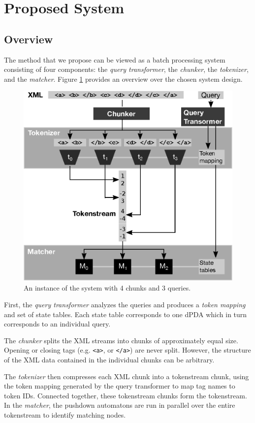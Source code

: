 \section{Proposed System}\label{sec:yourmethod}

\subsection{Overview}
The method that we propose can be viewed as a batch processing system consisting
of four components: the \emph{query
transformer}, the \emph{chunker}, the \emph{tokenizer}, and the \emph{matcher}.
Figure \ref{fig:methodoverview} provides an overview over the chosen system design.

\begin{figure}[tb]\centering
	\includegraphics[width=.5\textwidth]{img/methodoverview.eps}
  \caption{An instance of the system with 4 chunks and 3 queries.}
  \label{fig:methodoverview}
\end{figure}

First, the \emph{query transformer} analyzes the queries and produces a
\emph{token mapping} and set of state tables. Each state table corresponds to
one dPDA which in turn corresponds to an individual query.

The \emph{chunker} splits the XML streams into chunks of approximately equal
size. Opening or closing tags (e.g. \verb;<a>;, or \verb;</a>;) are never split. 
However, the structure of the XML data contained in the individual chunks can be 
arbitrary.

The \emph{tokenizer} then compresses each XML chunk into a tokenstream chunk,
using the token mapping generated by the query transformer to map tag names to
token IDs. Connected together, these tokenstream chunks form the tokenstream. 
In the \emph{matcher}, the pushdown automatons are run in parallel over the
entire tokenstream to identify matching nodes.


